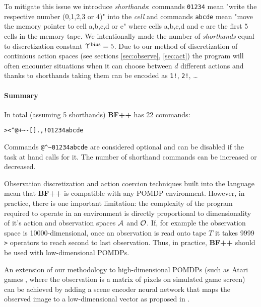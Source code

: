 To mitigate this issue we introduce \textit{shorthands}: commands \texttt{01234} mean "write the respective number (0,1,2,3 or 4)" into the \textit{cell} and commands \texttt{abcde} mean "move the memory pointer to cell a,b,c,d or e" where cells a,b,c,d and e are the first 5 cells in the memory tape.
We intentionally made the number of \textit{shorthands} equal to discretization constant $\Upsilon^\text{bins}=5$.
Due to our method of discretization of continious action spaces (see sections \ref{sec:observe}, \ref{sec:act}) the program will often encounter situations when it can choose between $d$ different actions and thanks to shorthands taking them can be encoded as \texttt{1!}, \texttt{2!}, \dots

\paragraph{Summary}
\label{sec:summary}

In total (assuming 5 shorthands) \textbf{BF++} has 22 commands:

\begin{center}
\begin{lstlisting}
><^@+~-[].,!01234abcde
\end{lstlisting}
\end{center}

Commands \verb|@^~01234abcde| are considered optional and can be disabled if the task at hand calls for it.
The number of shorthand commands can be increased or decreased.

Observation discretization and action coercion techniques built into the language mean that \textbf{BF++} is compatible with any POMDP environment. 
However, in practice, there is one important limitation: the complexity of the program required to operate in an environment is directly proportional to dimensionality of it's action and observation spaces $\mathcal{A}$ and $\mathcal{O}$. 
If, for example the observation space is 10000-dimensional, once an observation is read onto tape $T$ it takes 9999 \verb|>| operators to reach second to last observation.
Thus, in practice, \textbf{BF++} should be used with low-dimensional POMDPs.

An extension of our methodology to high-dimensional POMDPs (such as Atari games \cite{atari}, where the observation is a matrix of pixels on simulated game screen) can be achieved by adding a scene encoder neural network that maps the observed image to a low-dimensional vector as proposed in \cite{daqn}.

